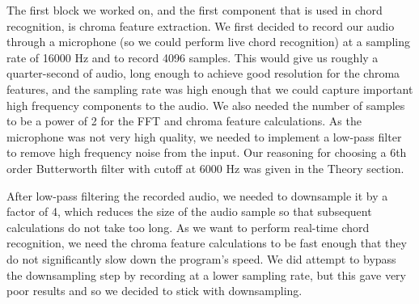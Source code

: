 \documentclass[journal]{IEEEtran}
\begin{document}
The first block we worked on, and the first component that is used in chord recognition, is chroma feature extraction.
We first decided to record our audio through a microphone (so we could perform live chord recognition) at a sampling rate of 16000 Hz and to record 4096 samples.
This would give us roughly a quarter-second of audio, long enough to achieve good resolution for the chroma features, and the sampling rate was high enough that we could capture important high frequency components to the audio.
We also needed the number of samples to be a power of 2 for the FFT and chroma feature calculations.
As the microphone was not very high quality, we needed to implement a low-pass filter to remove high frequency noise from the input.
Our reasoning for choosing a 6th order Butterworth filter with cutoff at 6000 Hz was given in the Theory section.

After low-pass filtering the recorded audio, we needed to downsample it by a factor of 4, which reduces the size of the audio sample so that subsequent calculations do not take too long.
As we want to perform real-time chord recognition, we need the chroma feature calculations to be fast enough that they do not significantly slow down the program's speed.
We did attempt to bypass the downsampling step by recording at a lower sampling rate, but this gave very poor results and so we decided to stick with downsampling.
\end{document}
